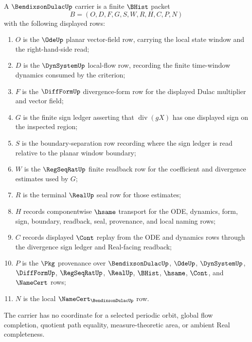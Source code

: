 \begin{definition}
\label{def:bendixson-dulac-carrier}
A $\BendixsonDulacUp$ carrier is a finite $\BHist$ packet
$$
B=(O,D,F,G,S,W,R,H,C,P,N)
$$
with the following displayed rows:
\begin{enumerate}
\item $O$ is the $\OdeUp$ planar vector-field row, carrying the local state window and the right-hand-side read;
\item $D$ is the $\DynSystemUp$ local-flow row, recording the finite time-window dynamics consumed by the criterion;
\item $F$ is the $\DiffFormUp$ divergence-form row for the displayed Dulac multiplier and vector field;
\item $G$ is the finite sign ledger asserting that $\operatorname{div}(gX)$ has one displayed sign on the inspected region;
\item $S$ is the boundary-separation row recording where the sign ledger is read relative to the planar window boundary;
\item $W$ is the $\RegSeqRatUp$ finite readback row for the coefficient and divergence estimates used by $G$;
\item $R$ is the terminal $\RealUp$ seal row for those estimates;
\item $H$ records componentwise $\hsame$ transport for the ODE, dynamics, form, sign, boundary, readback, seal, provenance, and local naming rows;
\item $C$ records displayed $\Cont$ replay from the ODE and dynamics rows through the divergence sign ledger and Real-facing readback;
\item $P$ is the $\Pkg$ provenance over $\BendixsonDulacUp$, $\OdeUp$, $\DynSystemUp$, $\DiffFormUp$, $\RegSeqRatUp$, $\RealUp$, $\BHist$, $\hsame$, $\Cont$, and $\NameCert$ rows;
\item $N$ is the local $\NameCert_{\BendixsonDulacUp}$ row.
\end{enumerate}
The carrier has no coordinate for a selected periodic orbit, global flow completion, quotient path equality, measure-theoretic area, or ambient Real completeness.
\end{definition}

